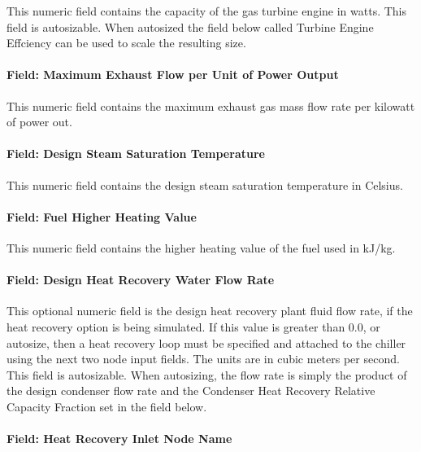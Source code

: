 This numeric field contains the capacity of the gas turbine engine in watts.  This field is autosizable.  When autosized the field below called Turbine Engine Effciency can be used to scale the resulting size.

\paragraph{Field: Maximum Exhaust Flow per Unit of Power Output}\label{field-maximum-exhaust-flow-per-unit-of-power-output-1-000}

This numeric field contains the maximum exhaust gas mass flow rate per kilowatt of power out.

\paragraph{Field: Design Steam Saturation Temperature}\label{field-design-steam-saturation-temperature}

This numeric field contains the design steam saturation temperature in Celsius.

\paragraph{Field: Fuel Higher Heating Value}\label{field-fuel-higher-heating-value-1-000}

This numeric field contains the higher heating value of the fuel used in kJ/kg.

\paragraph{Field: Design Heat Recovery Water Flow Rate}\label{field-design-heat-recovery-water-flow-rate-4}

This optional numeric field is the design heat recovery plant fluid flow rate, if the heat recovery option is being simulated. If this value is greater than 0.0, or autosize, then a heat recovery loop must be specified and attached to the chiller using the next two node input fields. The units are in cubic meters per second.  This field is autosizable. When autosizing, the flow rate is simply the product of the design condenser flow rate and the Condenser Heat Recovery Relative Capacity Fraction set in the field below.

\paragraph{Field: Heat Recovery Inlet Node Name}\label{field-heat-recovery-inlet-node-name-4}

